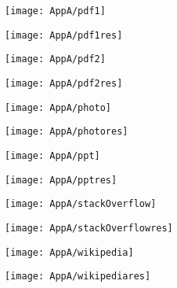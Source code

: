 \documentclass[draft,final]{vutinfth} %
\begin{document}
\begin{appendices}
\begin{figure}[H]
\begin{subfigure}[b]{0.45\columnwidth}
				\centering
				\texttt{[image: AppA/pdf1]}
			\end{subfigure}
			\begin{subfigure}[b]{0.45\columnwidth}
				\centering
				\texttt{[image: AppA/pdf1res]}
			\end{subfigure}
		\end{figure}   
			\begin{figure}[H]
			\centering
			\begin{subfigure}[b]{0.45\columnwidth}
				\centering
				\texttt{[image: AppA/pdf2]}
			\end{subfigure}
			\begin{subfigure}[b]{0.45\columnwidth}
				\centering
				\texttt{[image: AppA/pdf2res]}
			\end{subfigure}
		\end{figure}  
			\begin{figure}[H]
			\centering
			\begin{subfigure}[b]{0.45\columnwidth}
				\centering
				\texttt{[image: AppA/photo]}
			\end{subfigure}
			\begin{subfigure}[b]{0.45\columnwidth}
				\centering
				\texttt{[image: AppA/photores]}
			\end{subfigure}
		\end{figure}  
			\begin{figure}[H]
			\centering
			\begin{subfigure}[b]{0.45\columnwidth}
				\centering
				\texttt{[image: AppA/ppt]}
			\end{subfigure}
			\begin{subfigure}[b]{0.45\columnwidth}
				\centering
				\texttt{[image: AppA/pptres]}
			\end{subfigure}
		\end{figure}  
			\begin{figure}[H]
			\centering
			\begin{subfigure}[b]{0.45\columnwidth}
				\centering
				\texttt{[image: AppA/stackOverflow]}
			\end{subfigure}
			\begin{subfigure}[b]{0.45\columnwidth}
				\centering
				\texttt{[image: AppA/stackOverflowres]}
			\end{subfigure}
		\end{figure} 
			\begin{figure}[H]
			\centering
			\begin{subfigure}[b]{0.45\columnwidth}
				\centering
				\texttt{[image: AppA/wikipedia]}
			\end{subfigure}
			\begin{subfigure}[b]{0.45\columnwidth}
				\centering
				\texttt{[image: AppA/wikipediares]}
			\end{subfigure}
		\end{figure}   

\end{appendices}
\end{document}
